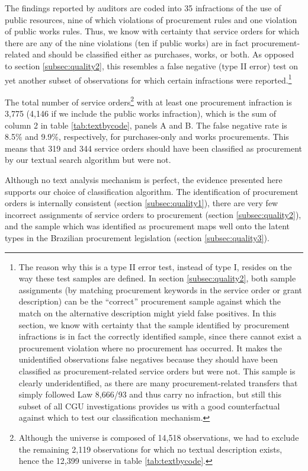 \documentclass[11pt]{article}
\begin{document}
The findings reported by auditors are coded into 35 infractions of the use of public resources, nine of which violations of procurement rules and one violation of public works rules. Thus, we know with certainty that service orders for which there are any of the nine violations (ten if public works) are in fact procurement-related and should be classified either as purchases, works, or both. As opposed to section \ref{subsec:quality2}, this resembles a false negative (type II error) test on yet another subset of observations for which certain infractions were reported.\footnote{The reason why this is a type II error test, instead of type I, resides on the way these test samples are defined. In section \ref{subsec:quality2}, both sample assignments (by matching procurement keywords in the service order or grant description) can be the ``correct'' procurement sample against which the match on the alternative description might yield false positives. In this section, we know with certainty that the sample identified by procurement infractions is in fact the correctly identified sample, since there cannot exist a procurement violation where no procurement has occurred. It makes the unidentified observations false negatives because they should have been classified as procurement-related service orders but were not. This sample is clearly underidentified, as there are many procurement-related transfers that simply followed Law 8,666/93 and thus carry no infraction, but still this subset of all CGU investigations provides us with a good counterfactual against which to test our classification mechanism.}


The total number of service orders\footnote{Although the universe is composed of 14,518 observations, we had to exclude the remaining 2,119 observations for which no textual description exists, hence the 12,399 universe in table \ref{tab:textbycode}.} with at least one procurement infraction is 3,775 (4,146 if we include the public works infraction), which is the sum of column 2 in table \ref{tab:textbycode}, panels A and B. The false negative rate is 8.5\% and 9.9\%, respectively, for purchases-only and works procurements. This means that 319 and 344 service orders should have been classified as procurement by our textual search algorithm but were not.

Although no text analysis mechanism is perfect, the evidence presented here supports our choice of classification algorithm. The identification of procurement orders is internally consistent (section \ref{subsec:quality1}), there are very few incorrect assignments of service orders to procurement (section \ref{subsec:quality2}), and the sample which was identified as procurement maps well onto the latent types in the Brazilian procurement legislation (section \ref{subsec:quality3}).
\newpage
\end{document}
